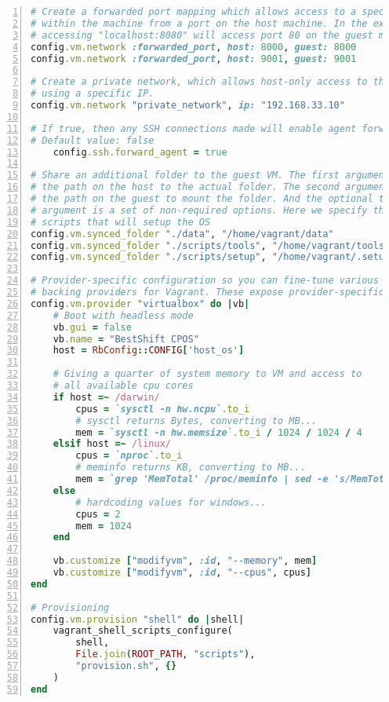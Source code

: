 \begin{lstlisting}[language=Ruby, caption=Vagrantfile,numbers=left, xleftmargin=1cm, numberstyle=\tiny\noncopynumber]
# Create a forwarded port mapping which allows access to a specific port
# within the machine from a port on the host machine. In the example below 
# accessing "localhost:8080" will access port 80 on the guest machine.
config.vm.network :forwarded_port, host: 8000, guest: 8000
config.vm.network :forwarded_port, host: 9001, guest: 9001

# Create a private network, which allows host-only access to the machine
# using a specific IP.
config.vm.network "private_network", ip: "192.168.33.10"

# If true, then any SSH connections made will enable agent forwarding.
# Default value: false
	config.ssh.forward_agent = true

# Share an additional folder to the guest VM. The first argument is
# the path on the host to the actual folder. The second argument is
# the path on the guest to mount the folder. And the optional third
# argument is a set of non-required options. Here we specify the 
# scripts that will setup the OS
config.vm.synced_folder "./data", "/home/vagrant/data"
config.vm.synced_folder "./scripts/tools", "/home/vagrant/tools"
config.vm.synced_folder "./scripts/setup", "/home/vagrant/.setup"

# Provider-specific configuration so you can fine-tune various
# backing providers for Vagrant. These expose provider-specific options.
config.vm.provider "virtualbox" do |vb|
	# Boot with headless mode
	vb.gui = false
	vb.name = "BestShift CPOS"
	host = RbConfig::CONFIG['host_os']

	# Giving a quarter of system memory to VM and access to 
	# all available cpu cores
	if host =~ /darwin/
		cpus = `sysctl -n hw.ncpu`.to_i
		# sysctl returns Bytes, converting to MB...
		mem = `sysctl -n hw.memsize`.to_i / 1024 / 1024 / 4
	elsif host =~ /linux/
		cpus = `nproc`.to_i
		# meminfo returns KB, converting to MB...
		mem = `grep 'MemTotal' /proc/meminfo | sed -e 's/MemTotal://' -e 's/ kB//'`.to_i / 1024 / 4
	else
		# hardcoding values for windows...
		cpus = 2
		mem = 1024
	end

	vb.customize ["modifyvm", :id, "--memory", mem]
	vb.customize ["modifyvm", :id, "--cpus", cpus]
end

# Provisioning
config.vm.provision "shell" do |shell|
	vagrant_shell_scripts_configure(
		shell,
		File.join(ROOT_PATH, "scripts"),
		"provision.sh",	{}
	)
end
\end{lstlisting}

